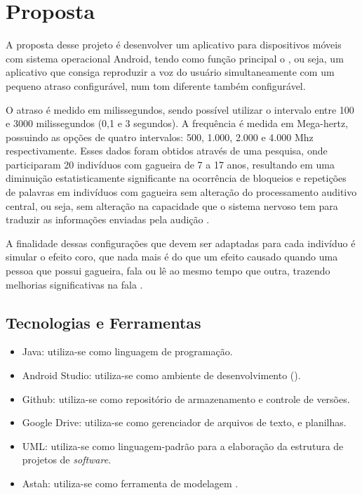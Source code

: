 \chapter{Proposta}

A proposta desse projeto \'e desenvolver um aplicativo para dispositivos m\'oveis com sistema operacional Android, tendo como fun\c{c}\~ao principal o , ou seja, um aplicativo que consiga reproduzir a voz do usu\'ario simultaneamente com um pequeno atraso configur\'avel, num tom diferente tamb\'em configur\'avel. 

O atraso \'e medido em milissegundos, sendo poss\'ivel utilizar o intervalo entre 100 e 3000 milissegundos (0,1 e 3 segundos). A frequ\^encia \'e medida em Mega-hertz, possuindo as op\c{c}\~oes de quatro intervalos: 500, 1.000, 2.000 e 4.000 Mhz respectivamente.  Esses dados foram obtidos atrav\'es de uma pesquisa, onde participaram 20 indiv\'iduos com gagueira de 7 a 17 anos, resultando em uma diminui\c{c}\~ao estatisticamente significante na ocorr\^encia de bloqueios e repeti\c{c}\~oes de palavras em indiv\'iduos com gagueira sem altera\c{c}\~ao do processamento auditivo central, ou seja, sem altera\c{c}\~ao na capacidade que o sistema nervoso tem para traduzir as informa\c{c}\~oes enviadas pela audi\c{c}\~ao \cite{PICOLOTO2017}.

A finalidade dessas configura\c{c}\~oes que devem ser adaptadas para cada indiv\'iduo \'e simular o efeito coro, que nada mais \'e do que um efeito causado quando uma pessoa que possui gagueira, fala ou l\^e ao mesmo tempo que outra, trazendo melhorias significativas na fala \cite{Udemo2008}.


\section{Tecnologias e Ferramentas}
\begin{itemize}
	
	\item Java: utiliza-se como linguagem de programa\c{c}\~ao.
	
	\item Android Studio: utiliza-se como ambiente de desenvolvimento 		().

	\item Github: utiliza-se como reposit\'orio de armazenamento e controle de vers\~oes.
	
	\item Google Drive: utiliza-se como gerenciador de arquivos de texto, e planilhas.

	\item UML: utiliza-se como linguagem-padr\~ao para a elabora\c{c}\~ao da estrutura de projetos de \textit{software}.

	\item Astah: utiliza-se como ferramenta de modelagem . 

\end{itemize}

